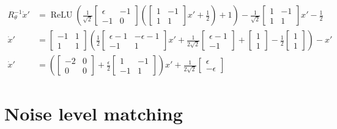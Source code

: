 \documentclass{article} %
\newcounter{ct}
\theoremstyle{definition}
\theoremstyle{remark}
\begin{document}
\begin{align}
R_{\theta}^{-1}\dot x' &= \operatorname{ReLU}\left(\frac{1}{\sqrt{2}}\begin{bmatrix}\epsilon &-1\\-1&0\end{bmatrix}\left(\begin{bmatrix}1 &-1\\1&1\end{bmatrix} x'+\frac{1}{2}\right)+1\right)-\frac{1}{\sqrt{2}}\begin{bmatrix}1 &-1\\1&1\end{bmatrix} x'-\frac{1}{2}\\
\dot x' &=\begin{bmatrix}-1 &1\\1&1\end{bmatrix}\left(\frac{1}{2}\begin{bmatrix}\epsilon-1 &-\epsilon-1\\-1&1\end{bmatrix}x' + \frac{1}{2\sqrt{2}}\begin{bmatrix}\epsilon-1 \\-1\end{bmatrix}+\begin{bmatrix}1 \\1\end{bmatrix}-\frac{1}{2}\begin{bmatrix}1 \\1\end{bmatrix}\right)-x'\\
\dot x' &=\left(\begin{bmatrix}-2 &0\\0&0\end{bmatrix}+\frac{\epsilon}{2}\begin{bmatrix}1 &-1\\-1&1\end{bmatrix}\right)x' + \frac{1}{2\sqrt{2}}\begin{bmatrix}\epsilon \\-\epsilon\end{bmatrix}
\end{align}


\newpage
\section{Noise level matching}\label{sec:supp:matching}
\end{document}
